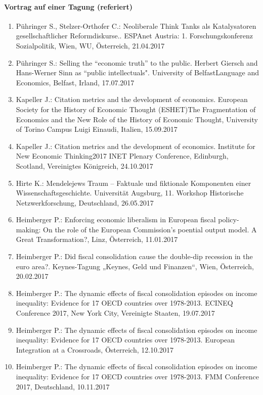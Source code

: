 \paragraph{Vortrag auf einer Tagung (referiert)}
\begin{enumerate}
	\item Pühringer S., Stelzer-Orthofer C.: Neoliberale Think Tanks als Katalysatoren gesellschaftlicher Reformdiskurse.. ESPAnet Austria: 1. Forschungskonferenz Sozialpolitik, Wien, WU, Österreich, 21.04.2017
	\item Pühringer S.: Selling the “economic truth” to the public. Herbert Giersch and Hans-Werner Sinn as “public intellectuals". University of BelfastLanguage and Economics, Belfast, Irland, 17.07.2017
	\item Kapeller J.: Citation metrics and the development of economics. European Society for the History of Economic Thought (ESHET)The Fragmentation of Economics and the New Role of the History of Economic Thought, University of Torino Campus Luigi Einaudi, Italien, 15.09.2017
	\item Kapeller J.: Citation metrics and the development of economics. Institute for New Economic Thinking2017 INET Plenary Conference, Edinburgh, Scotland, Vereinigtes Königreich, 24.10.2017
	\item Hirte K.: Mendelejews Traum – Faktuale und fiktionale Komponenten einer Wissenschaftsgeschichte. Universität Augsburg, 11. Workshop Historische Netzwerkforschung, Deutschland, 26.05.2017
	\item Heimberger P.: Enforcing economic liberalism in European fiscal policy-making: On the role of the European Commission’s poential output model. A Great Transformation?, Linz, Österreich, 11.01.2017
	\item Heimberger P.: Did fiscal consolidation cause the double-dip recession in the euro area?. Keynes-Tagung „Keynes, Geld und Finanzen“, Wien, Österreich, 20.02.2017
	\item Heimberger P.: The dynamic effects of fiscal consolidation episodes on income inequality: Evidence for 17 OECD countries over 1978-2013. ECINEQ Conference 2017, New York City, Vereinigte Staaten, 19.07.2017
	\item Heimberger P.: The dynamic effects of fiscal consolidation episodes on income inequality: Evidence for 17 OECD countries over 1978-2013. European Integration at a Crossroads, Österreich, 12.10.2017
	\item Heimberger P.: The dynamic effects of fiscal consolidation episodes on income inequality: Evidence for 17 OECD countries over 1978-2013. FMM Conference 2017, Deutschland, 10.11.2017

\end{enumerate}
